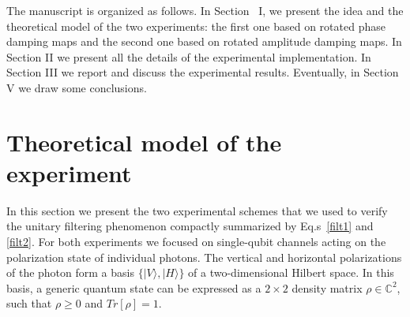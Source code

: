 \documentclass[aps,twocolumn,pra,superscriptaddress,showpacs,showkeys,floatfix]{revtex4-1}
\begin{document}
The manuscript is organized as follows. In Section \ I, we present the idea and the theoretical model of the two experiments: the first one based on rotated phase damping maps and the second one based on rotated amplitude damping maps. In Section II we present all the details of the experimental implementation. In Section III we report and discuss the experimental results. Eventually, in Section V we draw some conclusions. 

\section{Theoretical model of the experiment}

In this section we present the two experimental schemes that we used to verify the unitary filtering phenomenon compactly summarized  by Eq.s\ \eqref{filt1} and \eqref{filt2}. For both experiments we focused on single-qubit channels acting on the polarization state of individual photons. The vertical and horizontal polarizations of the photon form a basis $\{ | V \rangle, | H \rangle \}$  of a two-dimensional Hilbert space. In this basis, a generic quantum state can be expressed as a $2\times2$ density matrix $\rho \in \mathbb C^2$, such that $\rho\ge 0$ and $Tr[\rho]=1$.
\end{document}
